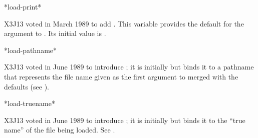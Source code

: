 \begin{newer}
\begin{defun}[Variable]
*load-print*

X3J13 voted in March 1989 
to add .
This variable provides the default for the  argument
to .  Its initial value is .
\end{defun}
\end{newer}

\begin{newer}
\begin{defun}[Variable]
*load-pathname*

X3J13 voted in June 1989  to introduce ;
it is initially  but  binds it to a pathname that
represents the file name given as the first argument to  merged
with the defaults (see ).
\end{defun}

\begin{defun}[Variable]
*load-truename*

X3J13 voted in June 1989  to introduce ;
it is initially  but  binds it to the ``true name'' of
the file being loaded.  See .
\end{defun}
\end{newer}

